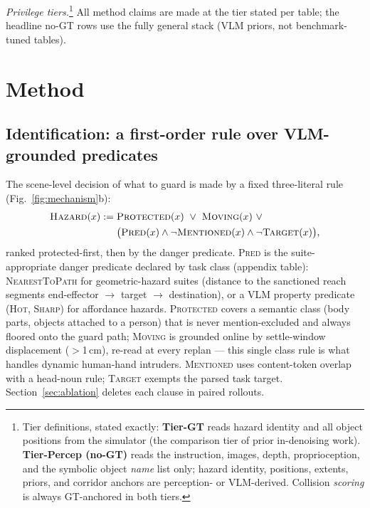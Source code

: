 \documentclass[conference]{IEEEtran}
\providecommand{\coloneqq}{\mathrel{:=}}
\begin{document}
\emph{Privilege tiers.}\footnote{Tier definitions, stated exactly: \textbf{Tier-GT} reads hazard identity and all object positions from the simulator (the comparison tier of prior in-denoising work). \textbf{Tier-Percep (no-GT)} reads the instruction, images, depth, proprioception, and the symbolic object \emph{name} list only; hazard identity, positions, extents, priors, and corridor anchors are perception- or VLM-derived. Collision \emph{scoring} is always GT-anchored in both tiers.} All method claims are made at the tier stated per table; the headline no-GT rows use the fully general stack (VLM priors, not benchmark-tuned tables).

\section{Method}
\label{sec:method}

\subsection{Identification: a first-order rule over VLM-grounded predicates}
\label{sec:ident}

The scene-level decision of what to guard is made by a fixed three-literal rule (Fig.~\ref{fig:mechanism}b):
\begin{equation}
\begin{aligned}
\textsc{Hazard}(x) \coloneqq{}& \textsc{Protected}(x)\ \vee\ \textsc{Moving}(x)\ \vee \\
&\big(\textsc{Pred}(x)\wedge\lnot\textsc{Mentioned}(x)\wedge\lnot\textsc{Target}(x)\big),
\end{aligned}
\label{eq:fol}
\end{equation}
ranked protected-first, then by the danger predicate. \textsc{Pred} is the suite-appropriate danger predicate declared by task class (appendix table): \textsc{NearestToPath} for geometric-hazard suites (distance to the sanctioned reach segments end-effector $\to$ target $\to$ destination), or a VLM property predicate (\textsc{Hot}, \textsc{Sharp}) for affordance hazards. \textsc{Protected} covers a semantic class (body parts, objects attached to a person) that is never mention-excluded and always floored onto the guard path; \textsc{Moving} is grounded online by settle-window displacement ($>$1\,cm), re-read at every replan --- this single class rule is what handles dynamic human-hand intruders. \textsc{Mentioned} uses content-token overlap with a head-noun rule; \textsc{Target} exempts the parsed task target. Section~\ref{sec:ablation} deletes each clause in paired rollouts.
\end{document}
